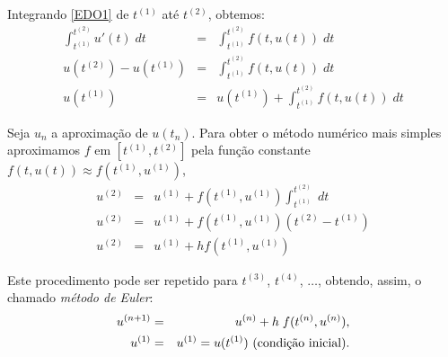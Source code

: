 Integrando \eqref{EDO1} de $t^{(1)}$ até $t^{(2)}$, obtemos:
\begin{eqnarray}
  \int_{t^{(1)}}^{t^{(2)}} u'(t) \;dt &=& \int_{t^{(1)}}^{t^{(2)}} f(t,u(t)) \; dt\\
  u(t^{(2)})-u(t^{(1)})               &=& \int_{t^{(1)}}^{t^{(2)}} f(t,u(t)) \; dt\\
  u(t^{(1)})                      &=& u(t^{(1)}) +  \int _{t^{(1)}}^{t^{(2)}} f(t,u(t)) \; dt
\end{eqnarray}

Seja $u_n$ a aproximação de $u(t_n)$. Para obter o método numérico mais simples aproximamos $f$ em $[t^{(1)},t^{(2)}]$ pela função constante $f(t,u(t)) \approx  f(t^{(1)},u^{(1)})$,
\begin{eqnarray}
  u^{(2)} &=&  u^{(1)} +   f(t^{(1)},u^{(1)}) \int _{t^{(1)}}^{t^{(2)}}  \; dt \\
  u^{(2)} &=&  u^{(1)} +   f(t^{(1)},u^{(1)}) (t^{(2)}-t^{(1)}) \\
  u^{(2)} &=&  u^{(1)} + h f(t^{(1)},u^{(1)})
\end{eqnarray}

Este procedimento pode ser repetido para  $t^{(3)}$, $t^{(4)}$, $\ldots$, obtendo, assim, o chamado \emph{método de Euler}:
\begin{eqnarray}\label{euler}
u^{(n+1)}&=&u^{(n)} + h\;f(t^{(n)},u^{(n)}),\\
u^{(1)}&=&u^{(1)}=u(t^{(1)})~ \hbox{(condição inicial)}.
\end{eqnarray}





